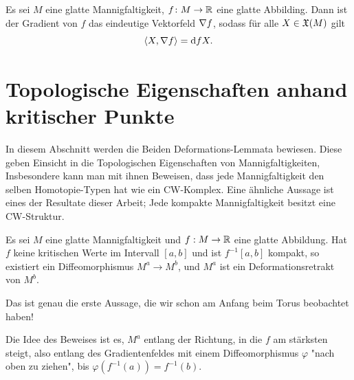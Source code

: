 \begin{definition}[Gradient]
    \label{def: gradient}
    Es sei $M$ eine glatte Mannigfaltigkeit, $f \colon M \to { \mathbb R }$ eine glatte Abbilding. Dann 
    ist der Gradient von $f$ das eindeutige Vektorfeld ${ \nabla } f$, sodass für alle $X \in { \mathfrak{X} } (M)$
    gilt 
    \[ \langle X , { \nabla } f \rangle = { \operatorname{d} } f X . \]
\end{definition}

\section{Topologische Eigenschaften anhand kritischer Punkte}

In diesem Abschnitt werden die Beiden Deformations-Lemmata bewiesen. Diese geben Einsicht in 
die Topologischen Eigenschaften von Mannigfaltigkeiten, Insbesondere kann man mit ihnen Beweisen, 
dass jede Mannigfaltigkeit den selben Homotopie-Typen hat wie ein CW-Komplex. Eine ähnliche Aussage
ist eines der Resultate dieser Arbeit; Jede kompakte Mannigfaltigkeit besitzt eine CW-Struktur.

\begin{theorem}
    \label{theorem:erstes deformationslemma}
    Es sei $M$ eine glatte Mannigfaltigkeit und $f: M \rightarrow { \mathbb R }$ eine
    glatte Abbildung. Hat $f$ keine kritischen Werte im Intervall $[a, b]$ und 
    ist $f^{-1}[a, b]$ kompakt, so existiert ein Diffeomorphismus 
    $M^a \rightarrow M^b$, und $M^a$ ist ein Deformationsretrakt von $M^b$.
\end{theorem}

Das ist genau die erste Aussage, die wir schon am Anfang beim Torus beobachtet 
haben!

Die Idee des Beweises ist es, $M^a$ entlang der Richtung, in die $f$ am stärksten
steigt, also entlang des Gradientenfeldes mit einem Diffeomorphismus $\varphi$ 
"nach oben zu ziehen", bis $\varphi(f^{-1}(a)) = f^{-1}(b)$.

